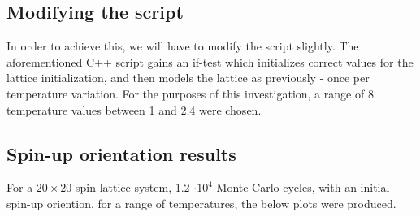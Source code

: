 \documentclass[11pt,a4paper,notitlepage,twocolumn]{article}
\begin{document}
\subsection{Modifying the script}
In order to achieve this, we will have to modify the script slightly. The aforementioned C++ script gains an if-test which initializes correct values for the lattice initialization, and then models the lattice as previously - once per temperature variation. For the purposes of this investigation, a range of 8 temperature values between 1 and 2.4 were chosen.
\subsection{Spin-up orientation results}
For a $20\times20$ spin lattice system, 1.2 $\cdot 10^4$ Monte Carlo cycles, with an initial spin-up oriention, for a range of temperatures, the below plots were produced.
\end{document}
